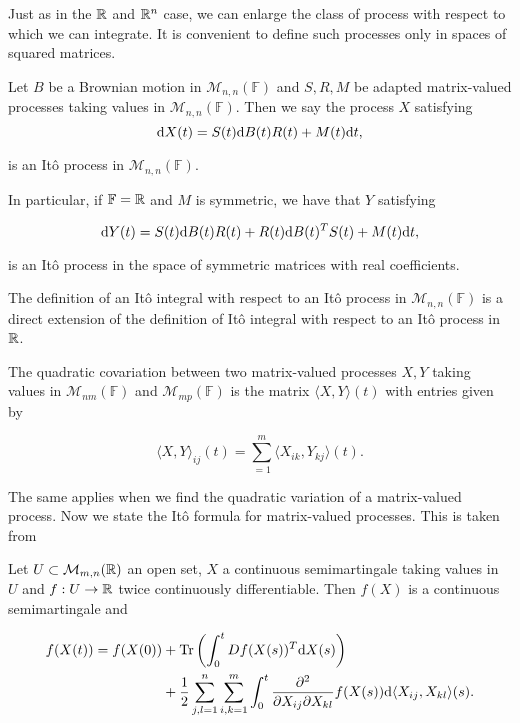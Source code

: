 Just as in the $\mathbb R$ and $\mathbb R^n$ case, we can enlarge the class of process with respect to which we can integrate. It is convenient to define such processes only in spaces of squared matrices.

\begin{definition}

    Let $B$ be a Brownian motion in $\mathcal M_{n,n}(\mathbb F)$ and $S, R, M$ be adapted matrix-valued processes taking values in $\mathcal M_{n,n}(\mathbb F)$. Then we say the process $X$ satisfying 
\begin{equation*}
    \mathrm d X(t) = S(t) \mathrm d B(t) R(t) + M(t) \mathrm d t, 
\end{equation*}

    \noindent is an Itô process in $\mathcal M_{n,n}(\mathbb F)$.

    In particular, if $\mathbb F = \mathbb R$ and $M$ is symmetric, we have that $Y$ satisfying

    \begin{equation*}
        \mathrm d Y(t) = S(t) \mathrm d B(t) R(t) + R(t) \mathrm d B(t)^T S(t) + M(t) \mathrm d t,
    \end{equation*}

    \noindent is an Itô process in the space of symmetric matrices with real coefficients.
\end{definition}

    The definition of an Itô integral with respect to an Itô process in $\mathcal M_{n,n}(\mathbb F)$ is a direct extension of the definition of Itô integral with respect to an Itô process in $\mathbb R$. 

The quadratic covariation between two matrix-valued processes $X, Y$ taking values in  $\mathcal M_{nm}(\mathbb F)$ and $\mathcal M_{mp}(\mathbb F)$ is the matrix $\langle X, Y\rangle(t)$ with entries given by

\begin{equation*}
    \langle X, Y \rangle_{ij} (t) = \sum_{=1}^m \langle X_{ik}, Y_{kj} \rangle (t).
\end{equation*}

The same applies when we find the quadratic variation of a matrix-valued process. Now we state the Itô formula for matrix-valued processes. This is taken from \cite{thesis_trujillo}

\begin{theorem}
    Let $U \subset \mathcal M_{m,n}(\mathbb R)$ an open set, $X$ a continuous semimartingale taking values in $U$ and $f: U \to \mathbb R$ twice continuously differentiable. Then $f(X)$ is a continuous semimartingale and

    \begin{align*}
        f(X(t)) = f(X(0)) &+ \mathrm{Tr}\left( \int_0^t D f(X(s))^T \mathrm d X(s) \right) \\ 
                &+ \frac12 \sum_{j,l=1}^n \sum_{i,k=1}^m \int_0^t \frac{\partial^2}{\partial X_{ij} \partial X_{kl}} f(X(s)) \mathrm d \langle X_{ij}, X_{kl} \rangle(s).
    \end{align*}
\end{theorem}

